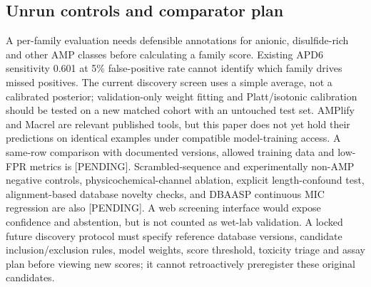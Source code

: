 \subsection*{Unrun controls and comparator plan}
A per-family evaluation needs defensible annotations for anionic, disulfide-rich and other AMP classes before calculating a family score. Existing APD6 sensitivity 0.601 at 5\% false-positive rate cannot identify which family drives missed positives. The current discovery screen uses a simple average, not a calibrated posterior; validation-only weight fitting and Platt/isotonic calibration should be tested on a new matched cohort with an untouched test set. AMPlify and Macrel are relevant published tools, but this paper does not yet hold their predictions on identical examples under compatible model-training access. A same-row comparison with documented versions, allowed training data and low-FPR metrics is [PENDING]. Scrambled-sequence and experimentally non-AMP negative controls, physicochemical-channel ablation, explicit length-confound test, alignment-based database novelty checks, and DBAASP continuous MIC regression are also [PENDING]. A web screening interface would expose confidence and abstention, but is not counted as wet-lab validation. A locked future discovery protocol must specify reference database versions, candidate inclusion/exclusion rules, model weights, score threshold, toxicity triage and assay plan before viewing new scores; it cannot retroactively preregister these original candidates.
